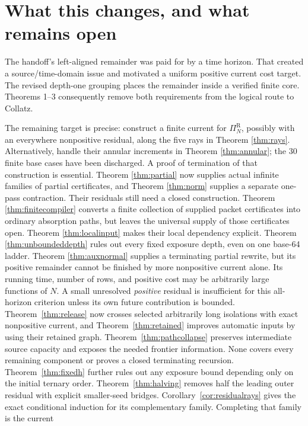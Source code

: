 \documentclass[11pt]{article}
\newcommand{\PiR}{\Pi^{\mathrm R}}
\begin{document}
\section{What this changes, and what remains open}
The handoff's left-aligned remainder was paid for by a time horizon. That
created a source/time-domain issue and motivated a uniform positive current
cost target. The revised depth-one grouping places the remainder inside a
verified finite core. Theorems 1--3 consequently remove both requirements
from the logical route to Collatz.

The remaining target is precise: construct a finite current for $\PiR_N$,
possibly with an everywhere nonpositive residual, along the five rays in
Theorem \ref{thm:rays}. Alternatively, handle their annular increments in
Theorem \ref{thm:annular}; the 30 finite base cases have been discharged.
A proof of termination of that construction is essential.
Theorem \ref{thm:partial} now supplies actual infinite families of
partial certificates, and Theorem \ref{thm:norm} supplies a separate
one-pass contraction. Their residuals still need a closed construction.
Theorem \ref{thm:finitecompiler} converts a finite collection of supplied
packet certificates into ordinary absorption paths, but leaves the
universal supply of those certificates open.
Theorem \ref{thm:localinput} makes their local dependency explicit.
Theorem \ref{thm:unboundeddepth} rules out every fixed exposure depth,
even on one base-64 ladder. Theorem \ref{thm:auxnormal} supplies a
terminating partial rewrite, but its positive remainder cannot be
finished by more nonpositive current alone.
Its running time, number of rows, and positive cost may be arbitrarily large
functions of $N$. A small unresolved \emph{positive} residual is insufficient
for this all-horizon criterion unless its own future contribution is bounded.
Theorem~\ref{thm:release} now crosses selected arbitrarily long
isolations with exact nonpositive current, and
Theorem~\ref{thm:retained} improves automatic inputs by using their
retained graph. Theorem~\ref{thm:pathcollapse} preserves intermediate
source capacity and exposes the needed frontier information.
None covers every remaining component or proves a closed terminating
recursion.
Theorem~\ref{thm:fixedh} further rules out any exposure bound depending
only on the initial ternary order. Theorem~\ref{thm:halving} removes
half the leading outer residual with explicit smaller-seed bridges.
Corollary~\ref{cor:residualrays} gives the exact conditional induction
for its complementary family. Completing that family is the current
\end{document}
